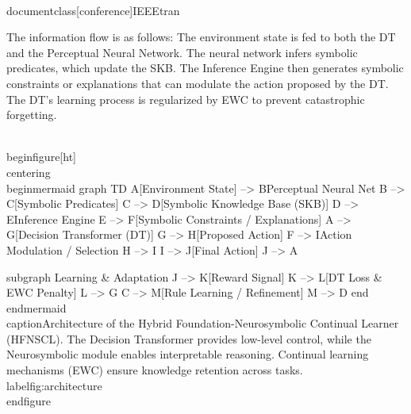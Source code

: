 \\documentclass[conference]{IEEEtran}
\begin{document}
The information flow is as follows: The environment state is fed to both the DT and the Perceptual Neural Network. The neural network infers symbolic predicates, which update the SKB. The Inference Engine then generates symbolic constraints or explanations that can modulate the action proposed by the DT. The DT's learning process is regularized by EWC to prevent catastrophic forgetting.

\\begin{figure}[ht]
\\centering
\\begin{mermaid}
graph TD
    A[Environment State] --> B{Perceptual Neural Net}
    B --> C[Symbolic Predicates]
    C --> D[Symbolic Knowledge Base (SKB)]
    D --> E{Inference Engine}
    E --> F[Symbolic Constraints / Explanations]
    A --> G[Decision Transformer (DT)]
    G --> H[Proposed Action]
    F --> I{Action Modulation / Selection}
    H --> I
    I --> J[Final Action]
    J --> A

    subgraph Learning & Adaptation
        J --> K[Reward Signal]
        K --> L[DT Loss & EWC Penalty]
        L --> G
        C --> M[Rule Learning / Refinement]
        M --> D
    end
\\end{mermaid}
\\caption{Architecture of the Hybrid Foundation-Neurosymbolic Continual Learner (HFNSCL). The Decision Transformer provides low-level control, while the Neurosymbolic module enables interpretable reasoning. Continual learning mechanisms (EWC) ensure knowledge retention across tasks.}
\\label{fig:architecture}
\\end{figure}
\end{document}
